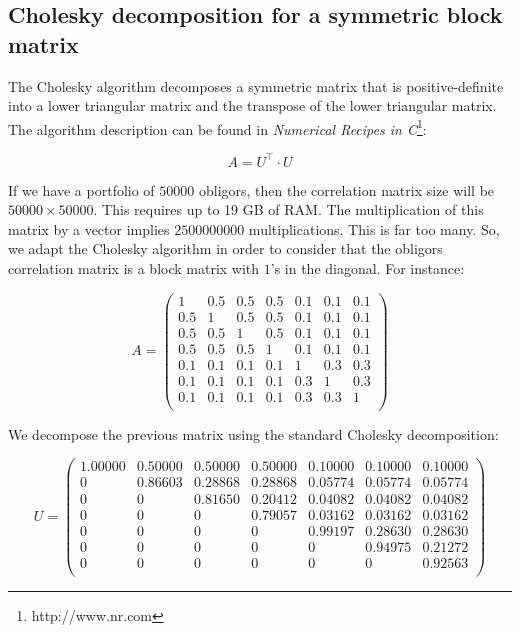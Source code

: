 \documentclass[a4paper,12pt,final]{article}
\begin{document}
\subsection{Cholesky decomposition for a symmetric block matrix}
\label{ap:cholblock}

The Cholesky algorithm decomposes a symmetric matrix that is positive-definite into a lower
triangular matrix and the transpose of the lower triangular matrix. The algorithm 
description can be found in \emph{Numerical Recipes in C}\footnote{http://www.nr.com}:

\begin{displaymath}
A = U^{\top} \cdot U
\end{displaymath}

If we have a portfolio of $50000$ obligors, then the correlation matrix size will
be $50000 \times 50000$. This requires up to 19 GB of RAM. The 
multiplication of this matrix by a vector implies $2500000000$ multiplications.
This is far too many. So, we adapt the Cholesky algorithm in order to consider that 
the obligors correlation matrix is a block matrix with $1$'s in the diagonal. 
For instance:

\begin{displaymath}
A = \left(
\begin{array}{cccc|ccc}
1   & 0.5 & 0.5 & 0.5 & 0.1 & 0.1 & 0.1 \\
0.5 & 1   & 0.5 & 0.5 & 0.1 & 0.1 & 0.1 \\
0.5 & 0.5 & 1   & 0.5 & 0.1 & 0.1 & 0.1 \\
0.5 & 0.5 & 0.5 & 1   & 0.1 & 0.1 & 0.1 \\
\hline
0.1 & 0.1 & 0.1 & 0.1 & 1   & 0.3 & 0.3 \\
0.1 & 0.1 & 0.1 & 0.1 & 0.3 & 1   & 0.3 \\
0.1 & 0.1 & 0.1 & 0.1 & 0.3 & 0.3 & 1   \\
\end{array}
\right)
\end{displaymath}

We decompose the previous matrix using the standard Cholesky decomposition:

\begin{displaymath}
U = \left(
\begin{array}{cccc|ccc}
 1.00000 & 0.50000 & 0.50000 & 0.50000 & 0.10000 & 0.10000 & 0.10000 \\
 0       & 0.86603 & 0.28868 & 0.28868 & 0.05774 & 0.05774 & 0.05774 \\
 0       & 0       & 0.81650 & 0.20412 & 0.04082 & 0.04082 & 0.04082 \\
 0       & 0       & 0       & 0.79057 & 0.03162 & 0.03162 & 0.03162 \\
\hline
 0       & 0       & 0       & 0       & 0.99197 & 0.28630 & 0.28630 \\
 0       & 0       & 0       & 0       & 0       & 0.94975 & 0.21272 \\
 0       & 0       & 0       & 0       & 0       & 0       & 0.92563 \\
\end{array}
\right)
\end{displaymath}
\end{document}
